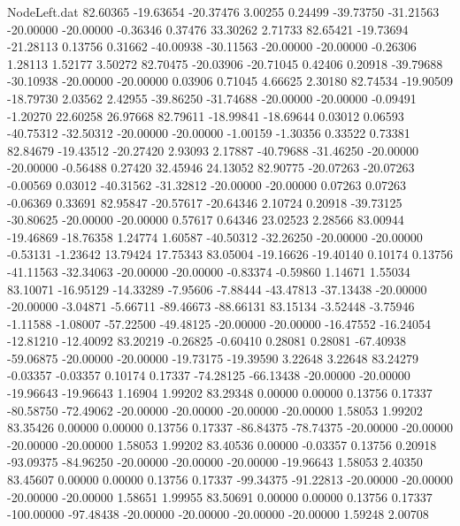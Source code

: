 \begin{filecontents}{NodeLeft.dat}
  82.60365  -19.63654  -20.37476     3.00255    0.24499  -39.73750  -31.21563  -20.00000  -20.00000   -0.36346    0.37476   33.30262    2.71733
  82.65421  -19.73694  -21.28113     0.13756    0.31662  -40.00938  -30.11563  -20.00000  -20.00000   -0.26306    1.28113    1.52177    3.50272
  82.70475  -20.03906  -20.71045     0.42406    0.20918  -39.79688  -30.10938  -20.00000  -20.00000    0.03906    0.71045    4.66625    2.30180
  82.74534  -19.90509  -18.79730     2.03562    2.42955  -39.86250  -31.74688  -20.00000  -20.00000   -0.09491   -1.20270   22.60258   26.97668
  82.79611  -18.99841  -18.69644     0.03012    0.06593  -40.75312  -32.50312  -20.00000  -20.00000   -1.00159   -1.30356    0.33522    0.73381
  82.84679  -19.43512  -20.27420     2.93093    2.17887  -40.79688  -31.46250  -20.00000  -20.00000   -0.56488    0.27420   32.45946   24.13052
  82.90775  -20.07263  -20.07263    -0.00569    0.03012  -40.31562  -31.32812  -20.00000  -20.00000    0.07263    0.07263   -0.06369    0.33691
  82.95847  -20.57617  -20.64346     2.10724    0.20918  -39.73125  -30.80625  -20.00000  -20.00000    0.57617    0.64346   23.02523    2.28566
  83.00944  -19.46869  -18.76358     1.24774    1.60587  -40.50312  -32.26250  -20.00000  -20.00000   -0.53131   -1.23642   13.79424   17.75343
  83.05004  -19.16626  -19.40140     0.10174    0.13756  -41.11563  -32.34063  -20.00000  -20.00000   -0.83374   -0.59860    1.14671    1.55034
  83.10071  -16.95129  -14.33289    -7.95606   -7.88444  -43.47813  -37.13438  -20.00000  -20.00000   -3.04871   -5.66711  -89.46673  -88.66131
  83.15134   -3.52448   -3.75946    -1.11588   -1.08007  -57.22500  -49.48125  -20.00000  -20.00000  -16.47552  -16.24054  -12.81210  -12.40092
  83.20219   -0.26825   -0.60410     0.28081    0.28081  -67.40938  -59.06875  -20.00000  -20.00000  -19.73175  -19.39590    3.22648    3.22648
  83.24279   -0.03357   -0.03357     0.10174    0.17337  -74.28125  -66.13438  -20.00000  -20.00000  -19.96643  -19.96643    1.16904    1.99202
  83.29348    0.00000    0.00000     0.13756    0.17337  -80.58750  -72.49062  -20.00000  -20.00000  -20.00000  -20.00000    1.58053    1.99202
  83.35426    0.00000    0.00000     0.13756    0.17337  -86.84375  -78.74375  -20.00000  -20.00000  -20.00000  -20.00000    1.58053    1.99202
  83.40536    0.00000   -0.03357     0.13756    0.20918  -93.09375  -84.96250  -20.00000  -20.00000  -20.00000  -19.96643    1.58053    2.40350
  83.45607    0.00000    0.00000     0.13756    0.17337  -99.34375  -91.22813  -20.00000  -20.00000  -20.00000  -20.00000    1.58651    1.99955
  83.50691    0.00000    0.00000     0.13756    0.17337 -100.00000  -97.48438  -20.00000  -20.00000  -20.00000  -20.00000    1.59248    2.00708

\end{filecontents}

